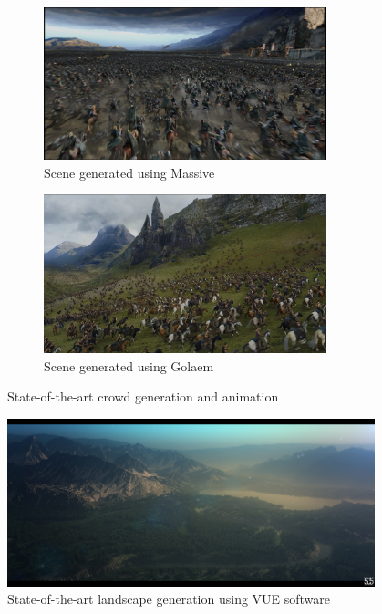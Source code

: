 \begin{figure}[h] \centering
  \begin{subfigure}[t]{0.5\textwidth}
    \includegraphics[width=0.9\textwidth]{img/massive.jpg}
    \caption{Scene generated using Massive}
    \label{fig:massive}
  \end{subfigure}%
  \begin{subfigure}[t]{0.5\textwidth}
    \includegraphics[width=0.9\textwidth]{img/golaem.jpg}
    \caption{Scene generated using Golaem}
    \label{fig:golaem}
  \end{subfigure}
  \caption{State-of-the-art crowd generation and animation}
  \label{fig:mg}
\end{figure}


\begin{figure}[h] \centering
  \includegraphics[width=0.95\textwidth]{img/vue.jpg}
  \caption{State-of-the-art landscape generation using VUE software}
  \label{fig:vue}
\end{figure}


